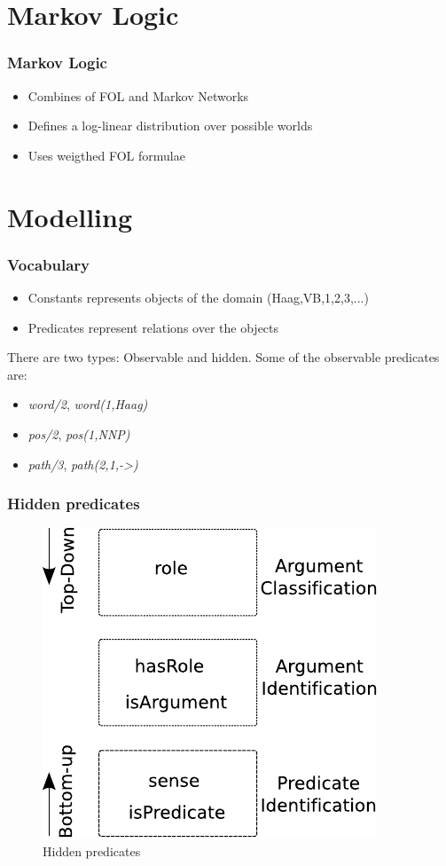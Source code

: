 \documentclass{beamer}
\begin{document}
\section{Markov Logic}

\begin{frame}
 \frametitle{Markov Logic}
 \begin{itemize}
 \item Combines of FOL and Markov Networks
 \item Defines a log-linear distribution over possible worlds
 \item Uses weigthed FOL formulae 
 \end{itemize}
\end{frame}

\section{Modelling}

\begin{frame}
    \frametitle{Vocabulary}
    \begin{itemize}
    \item Constants represents objects of the domain (Haag,VB,1,2,3,...)
    \item Predicates represent relations over the objects
    \end{itemize}

    There are two types: Observable and hidden. Some of the observable predicates are:
    \begin{itemize}
    \item \emph{word/2}, \emph{word(1,Haag)}
    \item \emph{pos/2},  \emph{pos(1,NNP)}
    \item \emph{path/3}, \emph{path(2,1,->)}
    \end{itemize}
    
\end{frame}

\begin{frame}
    \frametitle{Hidden predicates}
\begin{figure}
\begin{center}
   \includegraphics[scale=.70]{TaskArchitecture}
\end{center}
\caption{Hidden predicates}
\label{fig:task}
\end{figure}
\end{frame}
\end{document}
